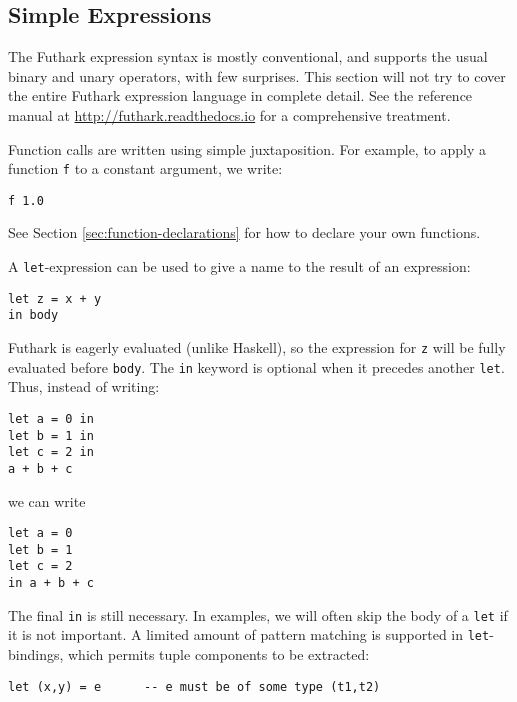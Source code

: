 \documentclass[oneside,11pt]{book}
\begin{document}
\subsection{Simple Expressions}

The Futhark expression syntax is mostly conventional, and supports the
usual binary and unary operators, with few surprises.  This section
will not try to cover the entire Futhark expression language in
complete detail.  See the reference manual at
\url{http://futhark.readthedocs.io} for a comprehensive treatment.

Function calls are written using simple juxtaposition.  For example,
to apply a function \texttt{f} to a constant argument, we write:

\begin{lstlisting}
f 1.0
\end{lstlisting}

\noindent
See Section \ref{sec:function-declarations} for how to declare your
own functions.

A \texttt{let}-expression can be used to give a name to the result of
an expression:

\begin{lstlisting}
let z = x + y
in body
\end{lstlisting}

Futhark is eagerly evaluated (unlike Haskell), so the expression for
\texttt{z} will be fully evaluated before \texttt{body}.  The \texttt{in} keyword is optional when it precedes another
\texttt{let}.  Thus, instead of writing:

\begin{lstlisting}
let a = 0 in
let b = 1 in
let c = 2 in
a + b + c
\end{lstlisting}

\noindent
we can write

\begin{lstlisting}
let a = 0
let b = 1
let c = 2
in a + b + c
\end{lstlisting}

\noindent
The final \texttt{in} is still necessary.  In examples, we will often
skip the body of a \texttt{let} if it is not important.  A limited
amount of pattern matching is supported in \texttt{let}-bindings,
which permits tuple components to be extracted:

\begin{lstlisting}
let (x,y) = e      -- e must be of some type (t1,t2)
\end{lstlisting}
\end{document}

